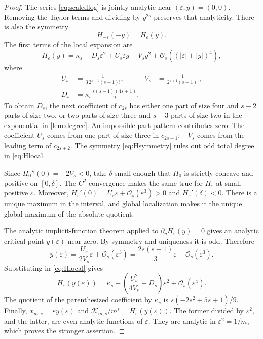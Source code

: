 \documentclass[11pt,a4paper]{article}
\theoremstyle{definition}
\newcommand{\bigO}{\mathcal O}
\newcommand{\Kopt}{\mathcal K}
\begin{document}
\begin{proof}
The series \eqref{eq:scaledlog} is jointly analytic near
$(\varepsilon,y)=(0,0)$. Removing the Taylor terms and dividing by
$y^{2s}$ preserves that analyticity. There is also the symmetry
\begin{equation}\label{eq:Hsymmetry}
 H_{-\varepsilon}(-y)=H_\varepsilon(y).
\end{equation}
The first terms of the local expansion are
\begin{equation}\label{eq:Hlocal}
 H_\varepsilon(y)=\kappa_s-D_s\varepsilon^2
                      +U_s\varepsilon y-V_s y^2
                      +\bigO_s((|\varepsilon|+|y|)^4),
\end{equation}
where
\begin{align*}
 U_s&=\frac1{3\,2^{s-1}(s-1)!},&
 V_s&=\frac1{2^{s+1}(s+1)!},\\
 D_s&=\kappa_s\frac{s(s-1)(4s+1)}9.
\end{align*}
To obtain $D_s$, the next coefficient of $c_{2s}$ has either one
part of size four and $s-2$ parts of size two, or two parts of size
three and $s-3$ parts of size two in the exponential in
\cref{lem:degree}. An impossible part pattern contributes zero.
The coefficient $U_s$ comes from one part of size three in
$c_{2s+1}$; $-V_s$ comes from the leading term of $c_{2s+2}$.
The symmetry \eqref{eq:Hsymmetry} rules out odd total degree in
\eqref{eq:Hlocal}.

Since $H_0''(0)=-2V_s<0$, take $\delta$ small enough that $H_0$ is
strictly concave and positive on $[0,\delta]$. The $C^2$ convergence
makes the same true for $H_\varepsilon$ at small positive
$\varepsilon$. Moreover,
$H_\varepsilon'(0)=U_s\varepsilon+\bigO_s(\varepsilon^3)>0$ and
$H_\varepsilon'(\delta)<0$. There is a unique maximum in the
interval, and global localization makes it the unique global maximum of
the absolute quotient.

The analytic implicit-function theorem applied to
$\partial_y H_\varepsilon(y)=0$ gives an analytic critical point
$y(\varepsilon)$ near zero. By symmetry and uniqueness it is odd.
Therefore
\[
 y(\varepsilon)=\frac{U_s}{2V_s}\varepsilon
                      +\bigO_s(\varepsilon^3)
 =\frac{2s(s+1)}3\varepsilon+\bigO_s(\varepsilon^3).
\]
Substituting in \eqref{eq:Hlocal} gives
\[
 H_\varepsilon(y(\varepsilon))
 =\kappa_s+\left(\frac{U_s^2}{4V_s}-D_s\right)\varepsilon^2
                  +\bigO_s(\varepsilon^4).
\]
The quotient of the parenthesized coefficient by $\kappa_s$ is
$s(-2s^2+5s+1)/9$. Finally,
$x_{m,s}=\varepsilon y(\varepsilon)$ and
$\Kopt_{m,s}/m^s=H_\varepsilon(y(\varepsilon))$.
The former divided by $\varepsilon^2$, and the latter, are even
analytic functions of $\varepsilon$. They are analytic in
$\varepsilon^2=1/m$, which proves the stronger assertion.
\end{proof}
\end{document}
